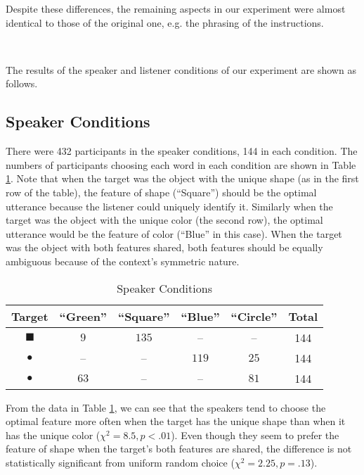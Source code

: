Despite these differences, the remaining aspects in our experiment were almost identical to those of the original one, e.g. the phrasing of the instructions.

\ 

The results of the speaker and listener conditions of our experiment are shown as follows.

 
\subsection{Speaker Conditions}

There were 432 participants in the speaker conditions, 144 in each condition. The numbers of participants choosing each word in each condition are shown in Table \ref{table:speaker}. Note that when the target was the object with the unique shape (as in the first row of the table), the feature of shape (``Square'') should be the optimal utterance because the listener could uniquely identify it. Similarly when the target was the object with the unique color (the second row), the optimal utterance would be the feature of color (``Blue'' in this case). When the target was the object with both features shared, both features should be equally ambiguous because of the context's symmetric nature.

\begin{table}[htb]   
  \caption{Speaker Conditions}
  \centering
  \begin{tabular}{c|ccccc}
   Target  & ``Green'' & ``Square'' & ``Blue'' & ``Circle'' & Total\\ 
     \hline
\textcolor{green!65}{\Large{$\blacksquare$}}    & $9$        &   $135$   & -- & -- &144\\
\textcolor{blue!65}{\Huge{$\bullet$}}           & --        &   --      & $119$ & $25$ & 144\\
\textcolor{green!65}{\Huge{$\bullet$}}          & $63$        &   --    &  --   & $81$             &144
  \end{tabular}

  \label{table:speaker}
\end{table}

From the data in Table \ref{table:speaker}, we can see that the speakers tend to choose the optimal feature more often when the target has the unique shape than when it has the unique color ($\chi^2=8.5, p<.01$). Even though they seem to prefer the feature of shape when the target's both features are shared, the difference is not statistically significant from uniform random choice ($\chi^2=2.25, p=.13$).


